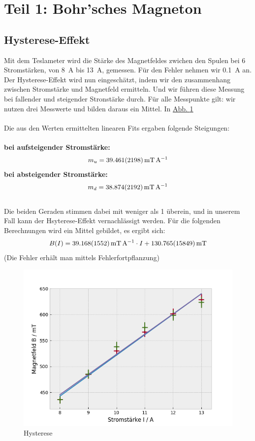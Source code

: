 \section{Teil 1: Bohr'sches Magneton}
  \subsection{Hysterese-Effekt}
    Mit dem Teslameter wird die Stärke des Magnetfeldes zwichen den Spulen bei 6 Stromstärken, von \SI{8}{\ampere} bis \SI{13}{\ampere}, gemessen. Für den Fehler nehmen wir \SI{0.1}{\ampere} an. Der Hysterese-Effekt wird nun eingeschätzt, indem wir den zusammenhang zwischen Stromstärke und Magnetfeld ermitteln. Und wir führen diese Messung bei fallender und steigender Stronstärke durch. Für alle Messpunkte gilt: wir nutzen drei Messwerte und bilden daraus ein Mittel. In \hyperref[plot::1]{Abb. \ref*{plot::1}}\\\\
    Die aus den Werten ermittelten linearen Fits ergaben folgende Steigungen:\\\\
    \textbf{bei aufsteigender Stromstärke:}
      \begin{align}
        m_u = \SI{39.461+-2.198}{\milli\tesla\per\ampere}
      \end{align}
    \textbf{bei absteigender Stromstärke:}
      \begin{align}
        m_d = \SI{38.874+-2.192}{\milli\tesla\per\ampere}
      \end{align}\\
    Die beiden Geraden stimmen dabei mit weniger als \SI{1}{\sigma} überein, und in unserem Fall kann der Hsyterese-Effekt vernachlässigt werden. Für die folgenden Berechnungen wird ein Mittel gebildet, es ergibt sich:
    \begin{align}
      B(I) = \SI{39.168+-1.552}{\milli\tesla\per\ampere} \cdot I + \SI{130.765+-15.849}{\milli\tesla}
    \end{align}
    (Die Fehler erhält man mittels Fehlerfortpflanzung)

    \begin{figure}[H]
      \centering
      \includegraphics[width=.6\paperwidth]{Auswertung/hysteresis}
      \caption{Hysterese}
      \label{plot::1}
    \end{figure}

